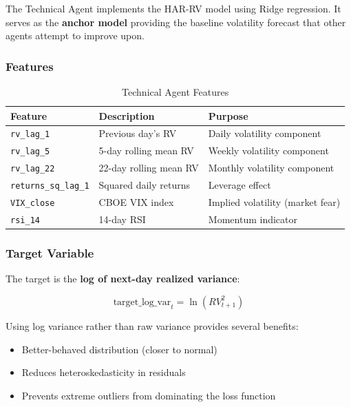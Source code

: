\documentclass[12pt,a4paper]{article}
\begin{document}
The Technical Agent implements the HAR-RV model using Ridge regression. It serves as the \textbf{anchor model} providing the baseline volatility forecast that other agents attempt to improve upon.

\subsubsection{Features}

\begin{table}[H]
\centering
\begin{tabular}{lll}
\toprule
\textbf{Feature} & \textbf{Description} & \textbf{Purpose} \\
\midrule
\texttt{rv\_lag\_1} & Previous day's RV & Daily volatility component \\
\texttt{rv\_lag\_5} & 5-day rolling mean RV & Weekly volatility component \\
\texttt{rv\_lag\_22} & 22-day rolling mean RV & Monthly volatility component \\
\texttt{returns\_sq\_lag\_1} & Squared daily returns & Leverage effect \\
\texttt{VIX\_close} & CBOE VIX index & Implied volatility (market fear) \\
\texttt{rsi\_14} & 14-day RSI & Momentum indicator \\
\bottomrule
\end{tabular}
\caption{Technical Agent Features}
\label{tab:tech_features}
\end{table}

\subsubsection{Target Variable}

The target is the \textbf{log of next-day realized variance}:

\begin{equation}
    \text{target\_log\_var}_t = \ln(RV_{t+1}^2)
\end{equation}

Using log variance rather than raw variance provides several benefits:
\begin{itemize}
    \item Better-behaved distribution (closer to normal)
    \item Reduces heteroskedasticity in residuals
    \item Prevents extreme outliers from dominating the loss function
\end{itemize}
\end{document}

